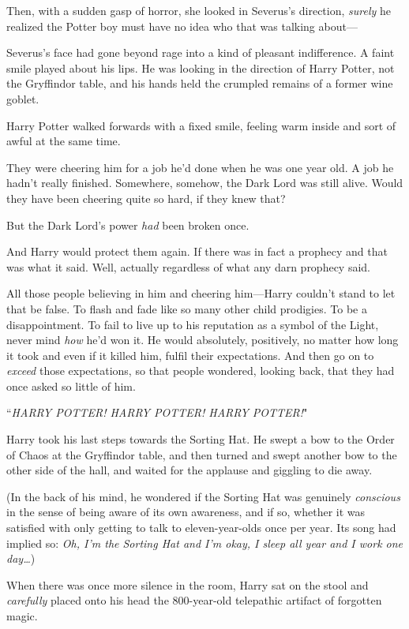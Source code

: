 Then, with a sudden gasp of horror, she looked in Severus's direction, \emph{surely} he realized the Potter boy must have no idea who that was talking about—

Severus's face had gone beyond rage into a kind of pleasant indifference. A faint smile played about his lips. He was looking in the direction of Harry Potter, not the Gryffindor table, and his hands held the crumpled remains of a former wine goblet.

\later

Harry Potter walked forwards with a fixed smile, feeling warm inside and sort of awful at the same time.

They were cheering him for a job he'd done when he was one year old. A job he hadn't really finished. Somewhere, somehow, the Dark Lord was still alive. Would they have been cheering quite so hard, if they knew that?

But the Dark Lord's power \emph{had} been broken once.

And Harry would protect them again. If there was in fact a prophecy and that was what it said. Well, actually regardless of what any darn prophecy said.

All those people believing in him and cheering him—Harry couldn't stand to let that be false. To flash and fade like so many other child prodigies. To be a disappointment. To fail to live up to his reputation as a symbol of the Light, never mind \emph{how} he'd won it. He would absolutely, positively, no matter how long it took and even if it killed him, fulfil their expectations. And then go on to \emph{exceed} those expectations, so that people wondered, looking back, that they had once asked so little of him.

``\emph{HARRY POTTER! HARRY POTTER! HARRY POTTER!}"

Harry took his last steps towards the Sorting Hat. He swept a bow to the Order of Chaos at the Gryffindor table, and then turned and swept another bow to the other side of the hall, and waited for the applause and giggling to die away.

(In the back of his mind, he wondered if the Sorting Hat was genuinely \emph{conscious} in the sense of being aware of its own awareness, and if so, whether it was satisfied with only getting to talk to eleven-year-olds once per year. Its song had implied so: \emph{Oh, I'm the Sorting Hat and I'm okay, I sleep all year and I work one day{\ldots}})

When there was once more silence in the room, Harry sat on the stool and \emph{carefully} placed onto his head the 800-year-old telepathic artifact of forgotten magic.

